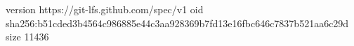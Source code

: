 version https://git-lfs.github.com/spec/v1
oid sha256:b51cded3b4564c986885e44c3aa928369b7fd13e16fbc646c7837b521aa6c29d
size 11436
